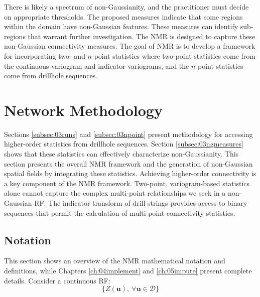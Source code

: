 There is likely a spectrum of non-Gaussianity, and the practitioner must decide on appropriate thresholds. The proposed measures indicate that some regions within the domain have non-Gaussian features. These measures can identify sub-regions that warrant further investigation. The \gls{NMR} is designed to capture these non-Gaussian connectivity measures. The goal of \gls{NMR} is to develop a framework for incorporating two- and $n$-point statistics where two-point statistics come from the continuous variogram and indicator variograms, and the $n$-point statistics come from drillhole sequences.


\FloatBarrier
\section{Network Methodology}
\label{sec:method}

Sections \ref{subsec:03runs} and \ref{subsec:03npoint} present methodology for accessing higher-order statistics from drillhole sequences. Section \ref{subsec:03ngmeasures} shows that these statistics can effectively characterize non-Gaussianity. This section presents the overall \gls{NMR} framework and the generation of non-Gaussian spatial fields by integrating these statistics. Achieving higher-order connectivity is a key component of the \gls{NMR} framework. Two-point, variogram-based statistics alone cannot capture the complex multi-point relationships we seek in a non-Gaussian \gls{RF}. The indicator transform of drill strings provides access to binary sequences that permit the calculation of multi-point connectivity statistics.


\FloatBarrier
\subsection{Notation}
\label{subsec:03notation}

This section shows an overview of the \gls{NMR} mathematical notation and definitions, while Chapters \ref{ch:04implement} and \ref{ch:05impute} present complete details. Consider a continuous \gls{RF}:
\begin{equation}
    \{Z(\mathbf{u}), \ \forall \mathbf{u} \in \mathcal{D}\}
    \label{eq:zu}
\end{equation}

